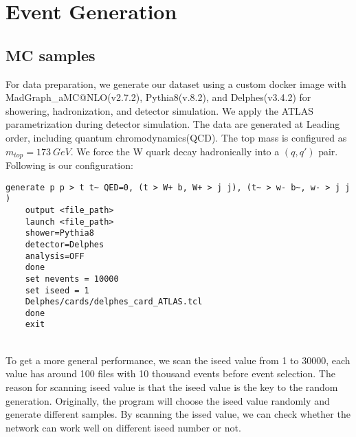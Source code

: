 \chapter{Event Generation}\label{Event Generation}



\section{MC samples}\label{sec:MC sample}
For data preparation, we generate our dataset using a custom docker image with MadGraph\_aMC@NLO(v2.7.2), Pythia8(v.8.2), and Delphes(v3.4.2) for showering, hadronization, and detector simulation. We apply the ATLAS parametrization during detector simulation.  The data are generated at Leading order, including quantum chromodynamics(QCD). The top mass is configured as $m_{top}=173\ GeV$. We force the W quark decay hadronically into a $(q, q')$ pair. Following is our configuration:
\\
\begin{adjustbox}{max width=\textwidth}
\centering
\begin{lstlisting}[caption={Configuration for generating samples},captionpos=b]
	generate p p > t t~ QED=0, (t > W+ b, W+ > j j), (t~ > w- b~, w- > j j ) 
	output <file_path> 
	launch <file_path> 
	shower=Pythia8  
	detector=Delphes 
	analysis=OFF 
	done  
	set nevents = 10000 
	set iseed = 1 
	Delphes/cards/delphes_card_ATLAS.tcl
	done 
	exit 
\end{lstlisting}
\end{adjustbox}
\\
To get a more general performance, we scan the iseed value from 1 to 30000, each value has around 100 files with 10 thousand events before event selection. The reason for scanning iseed value is that the iseed value is the key to the random generation. Originally, the program will choose the iseed value randomly and generate different samples. By scanning the issed value, we can check whether the network can work well on different iseed number or not.





